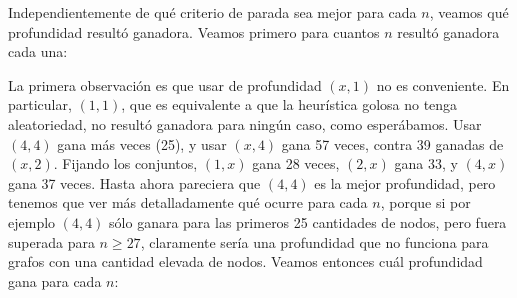 Independientemente de qué criterio de parada sea mejor para cada $n$, veamos qué profundidad resultó ganadora. Veamos primero para cuantos $n$ resultó ganadora cada una:
\begin{figure}[H]
    \begin{minipage}[t]{\linewidth}
		\centering
		\label{fig:ejercicio-5-histograma-rcl-conjunto-1}
    \end{minipage}
\end{figure}
La primera observación es que usar de profundidad $(x,1)$ no es conveniente. En particular, $(1,1)$, que es equivalente a que la heurística golosa no tenga aleatoriedad, no resultó ganadora para ningún caso, como esperábamos. Usar $(4,4)$ gana más veces (25), y usar $(x,4)$ gana 57 veces, contra 39 ganadas de $(x,2)$. Fijando los conjuntos, $(1,x)$ gana 28 veces, $(2,x)$ gana 33, y $(4,x)$ gana 37 veces. Hasta ahora pareciera que $(4,4)$ es la mejor profundidad, pero tenemos que ver más detalladamente qué ocurre para cada $n$, porque si por ejemplo $(4,4)$ sólo ganara para las primeros 25 cantidades de nodos, pero fuera superada para $n \geq 27$, claramente sería una profundidad que no funciona para grafos con una cantidad elevada de nodos. Veamos entonces cuál profundidad gana para cada $n$:
